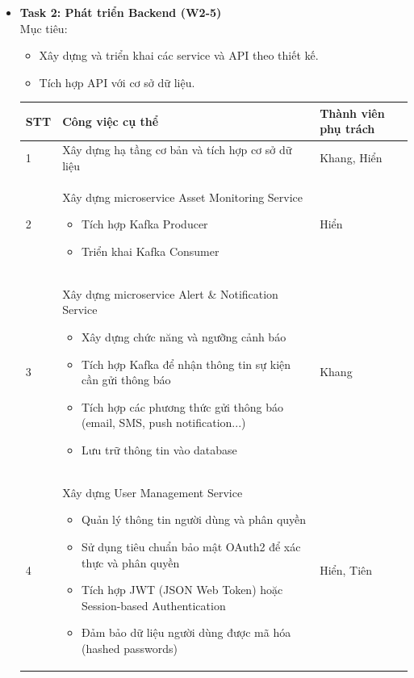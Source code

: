 \begin{itemize}
\item\textbf{Task 2: Phát triển Backend (W2-5)}\\
\indent Mục tiêu:
\begin{itemize}
    \item Xây dựng và triển khai các service và API theo thiết kế.
    \item Tích hợp API với cơ sở dữ liệu.
\end{itemize}
\begin{table}[H]
    \centering
    \begin{tabular}{|p{1cm}|p{8cm}|p{4cm}|}
        \hline
        \textbf{STT} & \textbf{Công việc cụ thể} & \textbf{Thành viên phụ trách} \\
        \hline
        1 & Xây dựng hạ tầng cơ bản và tích hợp cơ sở dữ liệu & Khang, Hiển \\
        \hline
        2 & Xây dựng microservice Asset Monitoring Service 
        \begin{itemize}
            \item Tích hợp Kafka Producer
            \item Triển khai Kafka Consumer
        \end{itemize} & Hiển \\
        \hline
        3 & Xây dựng microservice Alert \& Notification Service 
        \begin{itemize}
            \item Xây dựng chức năng và ngưỡng cảnh báo
            \item Tích hợp Kafka để nhận thông tin sự kiện cần gửi thông báo
            \item Tích hợp các phương thức gửi thông báo (email, SMS, push notification...)
            \item Lưu trữ thông tin vào database
        \end{itemize} & Khang\\
        \hline
        4 & Xây dựng User Management Service 
        \begin{itemize}
            \item Quản lý thông tin người dùng và phân quyền
            \item Sử dụng tiêu chuẩn bảo mật OAuth2 để xác thực và phân quyền
            \item Tích hợp JWT (JSON Web Token) hoặc Session-based Authentication
            \item Đảm bảo dữ liệu người dùng được mã hóa (hashed passwords)
        \end{itemize} & Hiển, Tiên \\

\end{tabular}
\end{table}
\end{itemize}
